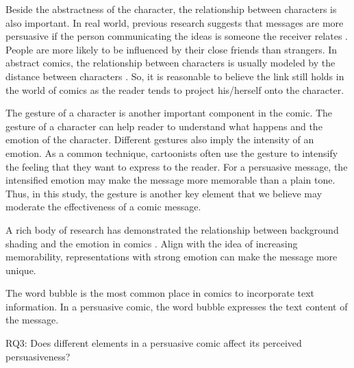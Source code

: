 Beside the abstractness of the character, the relationship between characters is also important. In real world, previous research suggests that messages are more persuasive if the person communicating the ideas is someone the receiver relates \cite{daddis2008influence,merga2014peer,shin2013user}. People are more likely to be influenced by their close friends than strangers. In abstract comics, the relationship between characters is usually modeled by the distance between characters \cite{scott1993understanding}. So, it is reasonable to believe the link still holds in the world of comics as the reader tends to project his/herself onto the character.

The gesture of a character is another important component in the comic. The gesture of a character can help reader to understand what happens and the emotion of the character. Different gestures also imply the intensity of an emotion. As a common technique, cartoonists often use the gesture to intensify the feeling that they want to express to the reader. For a persuasive message, the intensified emotion may make the message more memorable than a plain tone. Thus, in this study, the gesture is another key element that we believe may moderate the effectiveness of a comic message.

A rich body of research has demonstrated the relationship between background shading and the emotion in comics \cite{scott1993understanding}. Align with the idea of increasing memorability, representations with strong emotion can make the message more unique.

The word bubble is the most common place in comics to incorporate text information. In a persuasive comic, the word bubble expresses the text content of the message.

RQ3: Does different elements in a persuasive comic affect its perceived persuasiveness?
